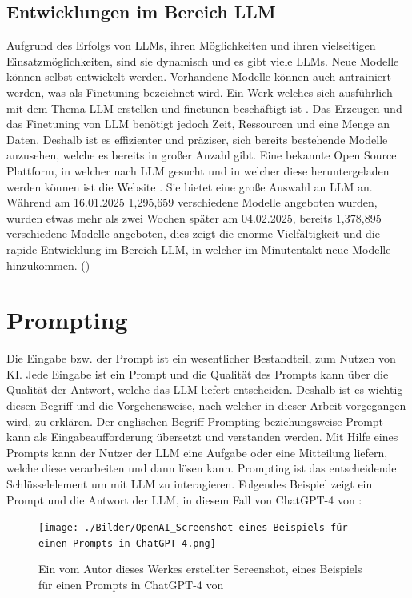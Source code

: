 \documentclass[12pt,toc=bib,toc=listof]{scrreprt}
\begin{document}
\subsection{Entwicklungen im Bereich LLM} %
\label{sec:entwicklungenImBereichLLM}
Aufgrund des Erfolgs von LLMs, ihren Möglichkeiten und ihren vielseitigen Einsatzmöglichkeiten, sind sie dynamisch und es gibt viele LLMs. Neue Modelle können selbst entwickelt werden. Vorhandene Modelle können auch antrainiert werden, was als Finetuning bezeichnet wird. Ein Werk welches sich ausführlich mit dem Thema LLM erstellen und finetunen beschäftigt ist \textcite{Géron2019}. Das Erzeugen und das Finetuning von LLM benötigt jedoch Zeit, Ressourcen und eine Menge an Daten. Deshalb ist es effizienter und präziser, sich bereits bestehende Modelle anzusehen, welche es bereits in großer Anzahl gibt. Eine bekannte Open Source Plattform, in welcher nach LLM gesucht und in welcher diese heruntergeladen werden können ist die Website \textcite{HuggingFace2025}. Sie bietet eine große Auswahl an LLM an. Während am 16.01.2025 1,295,659 verschiedene Modelle angeboten wurden, wurden etwas mehr als zwei Wochen später am 04.02.2025, bereits 1,378,895 verschiedene Modelle angeboten, dies zeigt die enorme Vielfältigkeit und die rapide Entwicklung im Bereich LLM, in welcher im Minutentakt neue Modelle hinzukommen. (\cite{Géron2019})\\

\section{Prompting} %
\label{sec:prompting}
Die Eingabe bzw. der Prompt ist ein wesentlicher Bestandteil, zum Nutzen von KI. Jede Eingabe ist ein Prompt und die Qualität des Prompts kann über die Qualität der Antwort, welche das LLM liefert entscheiden. Deshalb ist es wichtig diesen Begriff und die Vorgehensweise, nach welcher in dieser Arbeit vorgegangen wird, zu erklären. Der englischen Begriff Prompting beziehungsweise Prompt kann als Eingabeaufforderung übersetzt und verstanden werden. Mit Hilfe eines Prompts kann der Nutzer der LLM eine Aufgabe oder eine Mitteilung liefern, welche diese verarbeiten und dann lösen kann. Prompting ist das entscheidende Schlüsselelement um mit LLM zu interagieren. Folgendes Beispiel zeigt ein Prompt und die Antwort der LLM, in diesem Fall von ChatGPT-4 von \textcite{OpenAI2025}:

\begin{figure} [H]
    \centering
    \texttt{[image: ./Bilder/OpenAI\_Screenshot eines Beispiels für einen Prompts in ChatGPT-4.png]}
    \caption{Ein vom Autor dieses Werkes erstellter Screenshot, eines Beispiels für einen Prompts in ChatGPT-4 von \textcite{OpenAI2025}}
    \label{fig:enter-label}
\end{figure}
\end{document}
